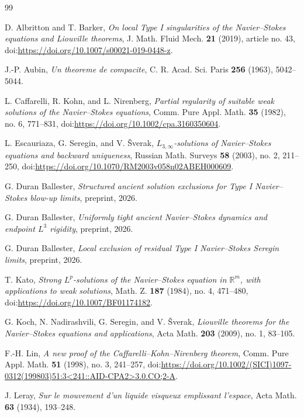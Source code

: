 \documentclass[11pt]{amsart}
\theoremstyle{plain}
\theoremstyle{definition}
\theoremstyle{remark}
\numberwithin{equation}{section}
\begin{document}
\begin{thebibliography}{99}

D. Albritton and T. Barker,
\emph{On local Type I singularities of the Navier--Stokes equations and
Liouville theorems},
J. Math. Fluid Mech. \textbf{21} (2019), article no. 43,
doi:\url{https://doi.org/10.1007/s00021-019-0448-z}.

J.-P. Aubin,
\emph{Un theoreme de compacite},
C. R. Acad. Sci. Paris \textbf{256} (1963), 5042--5044.

L. Caffarelli, R. Kohn, and L. Nirenberg,
\emph{Partial regularity of suitable weak solutions of the Navier--Stokes equations},
Comm. Pure Appl. Math. \textbf{35} (1982), no. 6, 771--831,
doi:\url{https://doi.org/10.1002/cpa.3160350604}.

L. Escauriaza, G. Seregin, and V. \v{S}verak,
\emph{\(L_{3,\infty}\)-solutions of Navier--Stokes equations and backward uniqueness},
Russian Math. Surveys \textbf{58} (2003), no. 2, 211--250,
doi:\url{https://doi.org/10.1070/RM2003v058n02ABEH000609}.

G. Duran Ballester,
\emph{Structured ancient solution exclusions for Type I Navier--Stokes blow-up
limits},
preprint, 2026.

G. Duran Ballester,
\emph{Uniformly tight ancient Navier--Stokes dynamics and endpoint \(L^3\)
rigidity},
preprint, 2026.

G. Duran Ballester,
\emph{Local exclusion of residual Type I Navier--Stokes Seregin limits},
preprint, 2026.

T. Kato,
\emph{Strong \(L^p\)-solutions of the Navier--Stokes equation in
\(\mathbb R^m\), with applications to weak solutions},
Math. Z. \textbf{187} (1984), no. 4, 471--480,
doi:\url{https://doi.org/10.1007/BF01174182}.

G. Koch, N. Nadirashvili, G. Seregin, and V. \v{S}verak,
\emph{Liouville theorems for the Navier--Stokes equations and applications},
Acta Math. \textbf{203} (2009), no. 1, 83--105.

F.-H. Lin,
\emph{A new proof of the Caffarelli--Kohn--Nirenberg theorem},
Comm. Pure Appl. Math. \textbf{51} (1998), no. 3, 241--257,
doi:\url{https://doi.org/10.1002/(SICI)1097-0312(199803)51:3<241::AID-CPA2>3.0.CO;2-A}.

J. Leray,
\emph{Sur le mouvement d'un liquide visqueux emplissant l'espace},
Acta Math. \textbf{63} (1934), 193--248.


\end{thebibliography}
\end{document}
